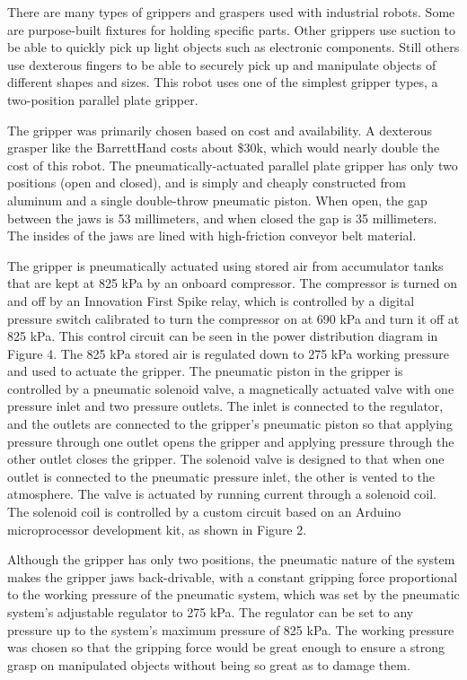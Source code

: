 \documentclass[]{cwru} %
\begin{document}
There are many types of grippers and graspers used with industrial
robots. Some are purpose-built fixtures for holding specific parts.
Other grippers use suction to be able to quickly pick up light objects
such as electronic components. Still others use dexterous fingers to be
able to securely pick up and manipulate objects of different shapes and
sizes. This robot uses one of the simplest gripper types, a two-position
parallel plate gripper.

The gripper was primarily chosen based on cost and availability. A
dexterous grasper like the BarrettHand costs about \$30k, which would
nearly double the cost of this robot. The pneumatically-actuated
parallel plate gripper has only two positions (open and closed), and is
simply and cheaply constructed from aluminum and a single double-throw
pneumatic piston. When open, the gap between the jaws is 53 millimeters,
and when closed the gap is 35 millimeters. The insides of the jaws are
lined with high-friction conveyor belt material.

The gripper is pneumatically actuated using stored air from accumulator
tanks that are kept at 825 kPa by an onboard compressor. The compressor
is turned on and off by an Innovation First Spike relay, which is
controlled by a digital pressure switch calibrated to turn the
compressor on at 690 kPa and turn it off at 825 kPa. This control
circuit can be seen in the power distribution diagram in Figure 4. The
825 kPa stored air is regulated down to 275 kPa working pressure and
used to actuate the gripper. The pneumatic piston in the gripper is
controlled by a pneumatic solenoid valve, a magnetically actuated valve
with one pressure inlet and two pressure outlets. The inlet is connected
to the regulator, and the outlets are connected to the gripper's
pneumatic piston so that applying pressure through one outlet opens the
gripper and applying pressure through the other outlet closes the
gripper. The solenoid valve is designed to that when one outlet is
connected to the pneumatic pressure inlet, the other is vented to the
atmosphere. The valve is actuated by running current through a solenoid
coil. The solenoid coil is controlled by a custom circuit based on an
Arduino microprocessor development kit, as shown in Figure 2.

Although the gripper has only two positions, the pneumatic nature of the
system makes the gripper jaws back-drivable, with a constant gripping
force proportional to the working pressure of the pneumatic system,
which was set by the pneumatic system's adjustable regulator to 275 kPa.
The regulator can be set to any pressure up to the system's maximum
pressure of 825 kPa. The working pressure was chosen so that the
gripping force would be great enough to ensure a strong grasp on
manipulated objects without being so great as to damage
them.
\end{document}
